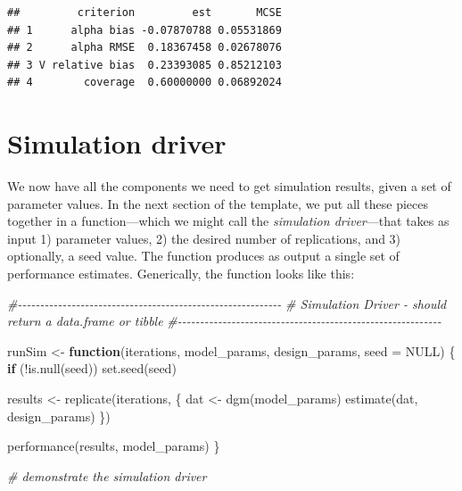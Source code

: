 \documentclass[
]{book}
\newenvironment{Shaded}{\begin{snugshade}}{\end{snugshade}}
\newcommand{\AttributeTok}[1]{\textcolor[rgb]{0.77,0.63,0.00}{#1}}
\newcommand{\CommentTok}[1]{\textcolor[rgb]{0.56,0.35,0.01}{\textit{#1}}}
\newcommand{\ConstantTok}[1]{\textcolor[rgb]{0.00,0.00,0.00}{#1}}
\newcommand{\ControlFlowTok}[1]{\textcolor[rgb]{0.13,0.29,0.53}{\textbf{#1}}}
\newcommand{\FunctionTok}[1]{\textcolor[rgb]{0.00,0.00,0.00}{#1}}
\newcommand{\NormalTok}[1]{#1}
\newcommand{\OtherTok}[1]{\textcolor[rgb]{0.56,0.35,0.01}{#1}}
\newcommand{\SpecialCharTok}[1]{\textcolor[rgb]{0.00,0.00,0.00}{#1}}
\begin{document}
\begin{verbatim}
##         criterion         est       MCSE
## 1      alpha bias -0.07870788 0.05531869
## 2      alpha RMSE  0.18367458 0.02678076
## 3 V relative bias  0.23393085 0.85212103
## 4        coverage  0.60000000 0.06892024
\end{verbatim}

\hypertarget{simulation-driver}{%
\section{Simulation driver}\label{simulation-driver}}

We now have all the components we need to get simulation results, given a set of parameter values. In the next section of the template, we put all these pieces together in a function---which we might call the \emph{simulation driver}---that takes as input 1) parameter values, 2) the desired number of replications, and 3) optionally, a seed value. The function produces as output a single set of performance estimates. Generically, the function looks like this:

\begin{Shaded}
\begin{Highlighting}[]
\CommentTok{\#{-}{-}{-}{-}{-}{-}{-}{-}{-}{-}{-}{-}{-}{-}{-}{-}{-}{-}{-}{-}{-}{-}{-}{-}{-}{-}{-}{-}{-}{-}{-}{-}{-}{-}{-}{-}{-}{-}{-}{-}{-}{-}{-}{-}{-}{-}{-}{-}{-}{-}{-}{-}{-}{-}{-}{-}{-}{-}{-}}
\CommentTok{\# Simulation Driver {-} should return a data.frame or tibble}
\CommentTok{\#{-}{-}{-}{-}{-}{-}{-}{-}{-}{-}{-}{-}{-}{-}{-}{-}{-}{-}{-}{-}{-}{-}{-}{-}{-}{-}{-}{-}{-}{-}{-}{-}{-}{-}{-}{-}{-}{-}{-}{-}{-}{-}{-}{-}{-}{-}{-}{-}{-}{-}{-}{-}{-}{-}{-}{-}{-}{-}{-}}

\NormalTok{runSim }\OtherTok{\textless{}{-}} \ControlFlowTok{function}\NormalTok{(iterations, model\_params, design\_params, }\AttributeTok{seed =} \ConstantTok{NULL}\NormalTok{) \{}
  \ControlFlowTok{if}\NormalTok{ (}\SpecialCharTok{!}\FunctionTok{is.null}\NormalTok{(seed)) }\FunctionTok{set.seed}\NormalTok{(seed)}

\NormalTok{  results }\OtherTok{\textless{}{-}} \FunctionTok{replicate}\NormalTok{(iterations, \{}
\NormalTok{                dat }\OtherTok{\textless{}{-}} \FunctionTok{dgm}\NormalTok{(model\_params)}
                \FunctionTok{estimate}\NormalTok{(dat, design\_params)}
\NormalTok{              \})}

  \FunctionTok{performance}\NormalTok{(results, model\_params)}
\NormalTok{\}}

\CommentTok{\# demonstrate the simulation driver}
\end{Highlighting}
\end{Shaded}
\end{document}
